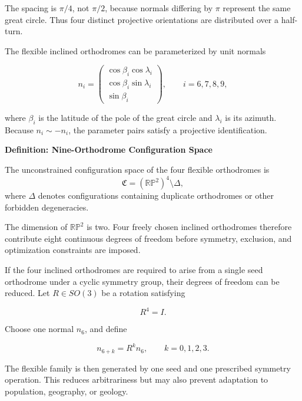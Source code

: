 \documentclass[11pt,fleqn]{book}
\numberwithin{equation}{chapter}
\newenvironment{definition}[1]
  {\begin{definitionEnv}
   \noindent\textbf{Definition: #1}\par\smallskip}
  {\end{definitionEnv}}
\theoremstyle{plain}
\theoremstyle{definition}
\theoremstyle{remark}
\begin{document}
The spacing is \(\pi/4\), not \(\pi/2\), because normals differing by \(\pi\) represent the same great circle. Thus four distinct projective orientations are distributed over a half-turn.

The flexible inclined orthodromes can be parameterized by unit normals

\begin{equation}
    n_i
    =
    \begin{pmatrix}
      \cos\beta_i\cos\lambda_i\\
      \cos\beta_i\sin\lambda_i\\
      \sin\beta_i
    \end{pmatrix},
    \qquad
    i=6,7,8,9,
\end{equation}

where \(\beta_i\) is the latitude of the pole of the great circle and \(\lambda_i\) is its azimuth. Because \(n_i\sim -n_i\), the parameter pairs satisfy a projective identification.

\begin{definition}{Nine-Orthodrome Configuration Space}
The unconstrained configuration space of the four flexible orthodromes is
\[
\mathfrak{C}
=
\left(\mathbb{RP}^{2}\right)^4
\setminus \Delta,
\]
where \(\Delta\) denotes configurations containing duplicate orthodromes or other forbidden degeneracies.
\end{definition}

The dimension of \(\mathbb{RP}^{2}\) is two. Four freely chosen inclined orthodromes therefore contribute eight continuous degrees of freedom before symmetry, exclusion, and optimization constraints are imposed.

If the four inclined orthodromes are required to arise from a single seed orthodrome under a cyclic symmetry group, their degrees of freedom can be reduced. Let \(R\in SO(3)\) be a rotation satisfying

\begin{equation}
    R^4=I.
\end{equation}

Choose one normal \(n_6\), and define

\begin{equation}
    n_{6+k}=R^k n_6,
    \qquad
    k=0,1,2,3.
\end{equation}

The flexible family is then generated by one seed and one prescribed symmetry operation. This reduces arbitrariness but may also prevent adaptation to population, geography, or geology.
\end{document}
